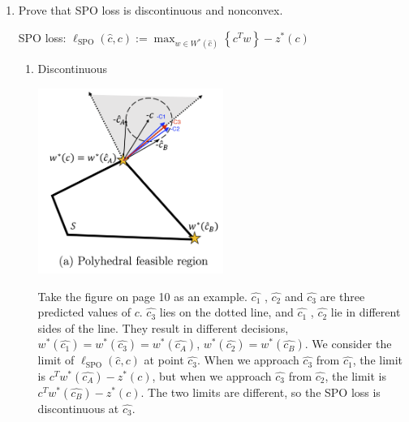 \documentclass[11pt]{article}
\begin{document}
\begin{enumerate}
    
    
    \item Prove that SPO loss is discontinuous and nonconvex.
    
    SPO loss: $\ell_{\mathrm{SPO}}(\hat{c}, c):=\max _{w \in W^{*}(\hat{c})}\left\{c^{T} w\right\}-z^{*}(c)$
    \begin{enumerate}
    
        \item Discontinuous
        
        \includegraphics[width=0.5\textwidth]{discontinuous.png}
        
       Take the figure on page 10 as an example. $\hat{c_1}$ , $\hat{c_2}$ and $\hat{c_3}$ are three predicted values of $c$. $\hat{c_3}$ lies on the dotted line, and $\hat{c_1}$ , $\hat{c_2}$ lie in different sides of the line. They result in different decisions, $w^*(\hat{c_1})=w^*(\hat{c_3})=w^*(\hat{c_A})$, $w^*(\hat{c_2})=w^*(\hat{c_B})$. We consider the limit of $\ell_{\mathrm{SPO}}(\hat{c}, c)$ at point $\hat{c_3}$. When we approach $\hat{c_3}$ from $\hat{c_1}$, the limit is $c^{T} w^*(\hat{c_A})-z^{*}(c)$, but when we approach $\hat{c_3}$ from $\hat{c_2}$, the limit is $c^{T} w^*(\hat{c_B})-z^{*}(c)$. The two limits are different, so the SPO loss is discontinuous at $\hat{c_3}$. 
        

\end{enumerate}
\end{enumerate}
\end{document}
